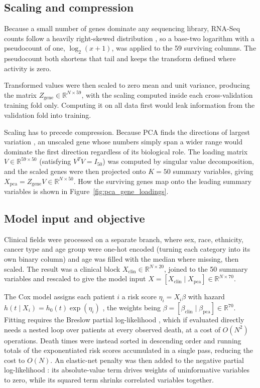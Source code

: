 \documentclass[10pt,a4paper]{article}
\begin{document}
\subsection{Scaling and compression}

Because a small number of genes dominate any sequencing library, RNA-Seq counts
follow a heavily right-skewed distribution \citep{love2014moderated}, so a base-two
logarithm with a pseudocount of one, $\log_2(x + 1)$, was applied to the 59
surviving columns. The pseudocount both shortens that tail and keeps the transform
defined where activity is zero.

Transformed values were then scaled to zero mean and unit variance, producing the
matrix $Z_{\text{gene}} \in \mathbb{R}^{N \times 59}$, with the scaling computed
inside each cross-validation training fold only. Computing it on all data first
would leak information from the validation fold into training.

Scaling has to precede compression. Because PCA finds the directions of largest
variation \citep{hotelling1933analysis, jolliffe2016principal}, an unscaled gene
whose numbers simply span a wider range would dominate the first direction
regardless of its biological role. The loading matrix
$V \in \mathbb{R}^{59 \times 50}$ (satisfying $V^{T} V = I_{50}$) was computed by
singular value decomposition, and the scaled genes were then projected onto
$K = 50$ summary variables, giving
$X_{\text{pca}} = Z_{\text{gene}} V \in \mathbb{R}^{N \times 50}$. How the surviving
genes map onto the leading summary variables is shown in
Figure~\ref{fig:pca_gene_loadings}.

\subsection{Model input and objective}

Clinical fields were processed on a separate branch, where sex, race, ethnicity,
cancer type and age group were one-hot encoded (turning each category into its own
binary column) and age was filled with the median where missing, then scaled. The
result was a clinical block $X_{\text{clin}} \in \mathbb{R}^{N \times 20}$, joined
to the 50 summary variables and rescaled to give the model input
$X = [X_{\text{clin}} \mid X_{\text{pca}}] \in \mathbb{R}^{N \times 70}$.

The Cox model assigns each patient $i$ a risk score $\eta_i = X_i \beta$ with
hazard $h(t \mid X_i) = h_0(t) \exp(\eta_i)$ \citep{cox1972regression}, the weights
being $\beta = [\beta_{\text{clin}} \mid \beta_{\text{pca}}] \in \mathbb{R}^{70}$.
Fitting requires the Breslow partial log-likelihood
\citep{breslow1972discussion}, which if evaluated directly needs a nested loop over
patients at every observed death, at a cost of $O(N^2)$ operations. Death times
were instead sorted in descending order and running totals of the exponentiated
risk scores accumulated in a single pass, reducing the cost to $O(N)$. An
elastic-net penalty was then added to the negative partial log-likelihood
\citep{zou2005regularization, wu2012elastic}: its absolute-value term drives
weights of uninformative variables to zero, while its squared term shrinks
correlated variables together.
\end{document}
